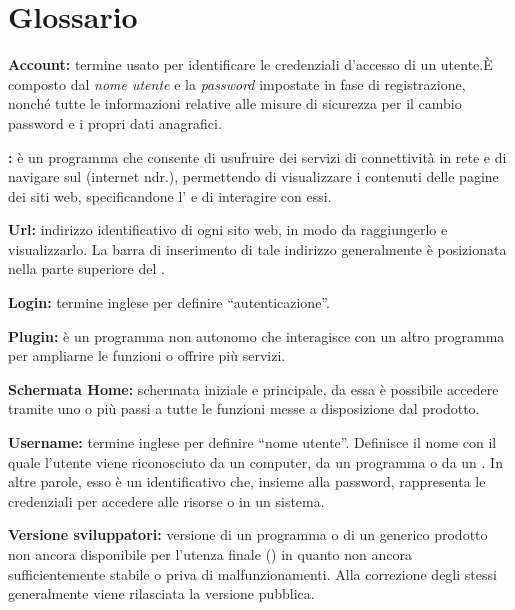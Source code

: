 \section{Glossario}
\begin{description}
\item\textbf{Account:} termine usato per identificare le credenziali d'accesso di un utente.È composto dal \textit{nome utente} e la \textit{password} impostate in fase di registrazione, nonché tutte le informazioni relative alle misure di sicurezza per il cambio password e i propri dati anagrafici.
\item\textbf{:} è un programma che consente di usufruire dei servizi di connettività in rete e di navigare sul  (internet ndr.), permettendo di visualizzare i contenuti delle pagine dei siti web, specificandone l' e di interagire con essi.
\item\textbf{Url:} indirizzo identificativo di ogni sito web, in modo da raggiungerlo e visualizzarlo. La barra di inserimento di tale indirizzo generalmente è posizionata nella parte superiore del .
\item\textbf{Login:} termine inglese per definire ``autenticazione''.
\item\textbf{Plugin:} è un programma non autonomo che interagisce con un altro programma per ampliarne le funzioni o offrire più servizi.
\item\textbf{Schermata Home:} schermata iniziale e principale, da essa è possibile accedere tramite uno o più passi a tutte le funzioni messe a disposizione dal prodotto.
\item\textbf{Username:} termine inglese per definire ``nome utente''. Definisce il nome con il quale l'utente viene riconosciuto da un computer, da un programma o da un . In altre parole, esso è un identificativo che, insieme alla password, rappresenta le credenziali per accedere alle risorse o in un sistema.
\item\textbf{Versione sviluppatori:} versione di un programma o di un generico prodotto non ancora disponibile per l'utenza finale () in quanto non ancora sufficientemente  stabile o priva di malfunzionamenti. Alla correzione degli stessi generalmente viene rilasciata la versione pubblica.
\end{description}

